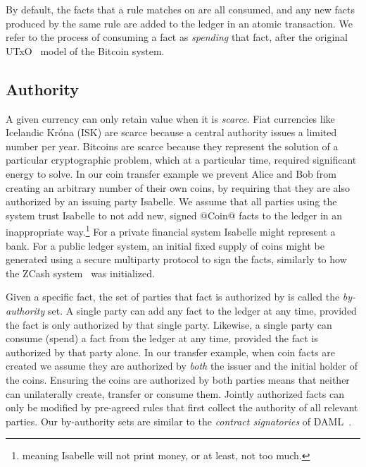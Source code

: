 By default, the facts that a rule matches on are all consumed, and any new facts produced by the same rule are added to the ledger in an atomic transaction. We refer to the process of consuming a fact as \emph{spending} that fact, after the original UTxO~\cite{Zahnentferner2018:UTxO} model of the Bitcoin system.


\subsection{Authority}
\label{s:FactAuthority}
A given currency can only retain value when it is \emph{scarce}. Fiat currencies like Icelandic Kr\'ona (ISK) are scarce because a central authority issues a limited number per year. Bitcoins are scarce because they represent the solution of a particular cryptographic problem, which at a particular time, required significant energy to solve. In our coin transfer example we prevent Alice and Bob from creating an arbitrary number of their own coins, by requiring that they are also authorized by an issuing party Isabelle. We assume that all parties using the system trust Isabelle to not add new, signed @Coin@ facts to the ledger in an inappropriate way.\footnote{meaning Isabelle will not print money, or at least, not too much.} For a private financial system Isabelle might represent a bank. For a public ledger system, an initial fixed supply of coins might be generated using a secure multiparty protocol to sign the facts, similarly to how the ZCash system~\cite{Bowe2018:MultiParty, Hopwood2016:zcash} was initialized.

\eject{}
Given a specific fact, the set of parties that fact is authorized by is called the \emph{by-authority} set. A single party can add any fact to the ledger at any time, provided the fact is only authorized by that single party. Likewise, a single party can consume (spend) a fact from the ledger at any time, provided the fact is authorized by that party alone. In our transfer example, when coin facts are created we assume they are authorized by \emph{both} the issuer and the initial holder of the coins. Ensuring the coins are authorized by both parties means that neither can unilaterally create, transfer or consume them. Jointly authorized facts can only be modified by pre-agreed rules that first collect the authority of all relevant parties. Our by-authority sets are similar to the \emph{contract signatories} of DAML~\cite{DA2019:DAML}.

